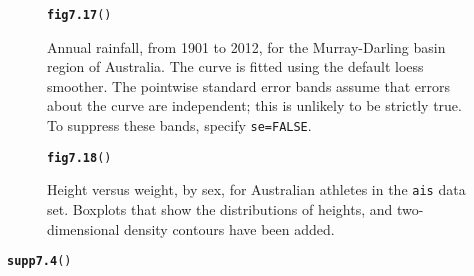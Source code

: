 \documentclass[12pt, a4paper,  BCOR=8.25mm, DIV=15]{scrartcl}\usepackage[]{graphicx}\usepackage[]{color}
\makeatletter
\newcommand{\hlstd}[1]{\textcolor[rgb]{0.345,0.345,0.345}{#1}}%
\newcommand{\hlkwd}[1]{\textcolor[rgb]{0.737,0.353,0.396}{\textbf{#1}}}%
\newenvironment{kframe}{%
 \def\at@end@of@kframe{}%
 \ifinner\ifhmode%
  \def\at@end@of@kframe{\end{minipage}}%
  \begin{minipage}{\columnwidth}%
 \fi\fi%
 \def\FrameCommand##1{\hskip\@totalleftmargin \hskip-\fboxsep
 \colorbox{shadecolor}{##1}\hskip-\fboxsep
     \hskip-\linewidth \hskip-\@totalleftmargin \hskip\columnwidth}%
 \MakeFramed {\advance\hsize-\width
   \@totalleftmargin\z@ \linewidth\hsize
   \@setminipage}}%
 {\par\unskip\endMakeFramed%
 \at@end@of@kframe}
\newenvironment{knitrout}{}{} %
\makeatother
\begin{document}
\addtocounter{figure}{1}

\begin{figure}[ht]
\begin{knitrout}
\color{fgcolor}\begin{kframe}
\begin{alltt}
\hlkwd{fig7.17}\hlstd{()}
\end{alltt}


{\ttfamily\noindent\bfseries{}}\end{kframe}
\end{knitrout}
\caption{Annual rainfall, from 1901 to 2012, for the Murray-Darling
  basin region of Australia.  The curve is fitted using the default
  loess smoother. The pointwise standard error bands assume that
  errors about the curve are independent; this is unlikely to be
  strictly true. To suppress these bands, specify
  \texttt{se=FALSE}.\label{fig:ggrain}}
\end{figure}

\begin{figure}[ht]
\begin{knitrout}
\color{fgcolor}\begin{kframe}
\begin{alltt}
\hlkwd{fig7.18}\hlstd{()}
\end{alltt}


{\ttfamily\noindent\bfseries{}}\end{kframe}
\end{knitrout}
\caption{Height versus weight, by sex, for Australian athletes in the
\texttt{ais} data set. Boxplots that show the distributions of heights,
and two-dimensional density contours have been
added.\label{fig:ggais}}

\end{figure}

\begin{suppfigure}
\begin{knitrout}
\color{fgcolor}\begin{kframe}
\begin{alltt}
\hlkwd{supp7.4}\hlstd{()}
\end{alltt}


{\ttfamily\noindent\bfseries{}}\end{kframe}
\end{knitrout}
\caption{Annual rainfall, from 1901 to 2012, for the Murray-Darling
  basin region of Australia.  Curves that estimate the 20\%, 50\% and 80\%
  quantiles have been fitted.\label{fig:ggrainpc}}
\end{suppfigure}
\end{document}
